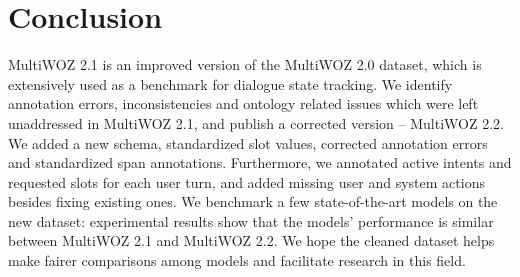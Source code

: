 \section{Conclusion}
MultiWOZ 2.1 \cite{eric2019multiwoz} is an improved version of the MultiWOZ 2.0 dataset, which is extensively used as a benchmark for dialogue state tracking. We identify annotation errors, inconsistencies and ontology related issues which were left unaddressed in MultiWOZ 2.1, and publish a corrected version -- MultiWOZ 2.2. We added a new schema, standardized slot values, corrected annotation errors and standardized span annotations. Furthermore, we annotated active intents and requested slots for each user turn, and added missing user and system actions besides fixing existing ones. We benchmark a few state-of-the-art models on the new dataset: experimental results show that the models' performance is similar between MultiWOZ 2.1 and MultiWOZ 2.2. We hope the cleaned dataset helps make fairer comparisons among models and facilitate research in this field.

